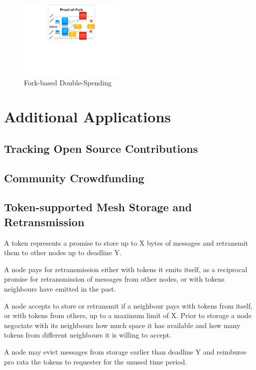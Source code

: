 \documentclass[sigplan,screen,10pt]{acmart}
\begin{document}
\begin{figure}[hb]
\centering
\includegraphics[width=0.45\textwidth]{figures/fork-double-spend}
\caption{Fork-based Double-Spending}
\end{figure}

\section{Additional Applications}
\label{section:applications}

\subsection{Tracking Open Source Contributions}

\subsection{Community Crowdfunding}

\subsection{Token-supported Mesh Storage and Retransmission}

A token represents a promise to store up to X bytes of messages and retransmit them to other nodes up to deadline Y.

A node pays for retransmission either with tokens it emits itself, as a reciprocal promise for retransmission of messages from other nodes, or with tokens neighbours have emitted in the past.

A node accepts to store or retransmit if a neighbour pays with tokens from itself, or with tokens from others, up to a maximum limit of X. Prior to storage a node negociate with its neighbours how much space it has available and how many tokens from different neighbours it is willing to accept.

A node may evict messages from storage earlier than deadline Y and reimburse pro rata the tokens to requester for the unused time period.
\end{document}

